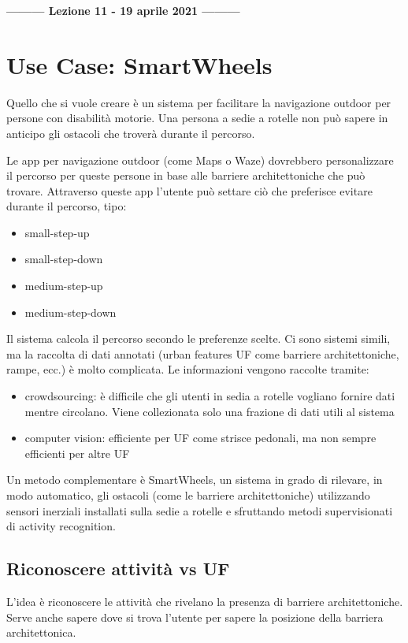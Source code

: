 \begin{center}
    \textbf{--------- Lezione 11 - 19 aprile 2021 ---------}
\end{center}

\section{Use Case: SmartWheels}
Quello che si vuole creare è un sistema per facilitare la navigazione outdoor per persone con disabilità motorie. 
Una persona a sedie a rotelle non può sapere in anticipo gli ostacoli che troverà durante il percorso.

Le app per navigazione outdoor (come Maps o Waze) dovrebbero personalizzare il percorso per queste persone in base alle barriere architettoniche che può trovare.
Attraverso queste app l'utente può settare ciò che preferisce evitare durante il percorso, tipo: 
\begin{itemize}
    \item small-step-up
    \item small-step-down
    \item medium-step-up
    \item medium-step-down
\end{itemize}
Il sistema calcola il percorso secondo le preferenze scelte.
Ci sono sistemi simili, ma la raccolta di dati annotati (urban features UF come barriere architettoniche, rampe, ecc.) è molto complicata. 
Le informazioni vengono raccolte tramite: 
\begin{itemize}
    \item crowdsourcing: è difficile che gli utenti in sedia a rotelle vogliano fornire dati mentre circolano. Viene collezionata solo una frazione di dati utili al sistema
    \item computer vision: efficiente per UF come strisce pedonali, ma non sempre efficienti per altre UF
\end{itemize}

Un metodo complementare è SmartWheels, un sistema in grado di rilevare, in modo automatico, gli ostacoli (come le barriere architettoniche) utilizzando sensori inerziali installati sulla sedie a rotelle e sfruttando metodi supervisionati di activity recognition. 

\subsection{Riconoscere attività vs UF}
L'idea è riconoscere le attività che rivelano la presenza di barriere architettoniche. Serve anche sapere dove si trova l'utente per sapere la posizione della barriera architettonica. 

